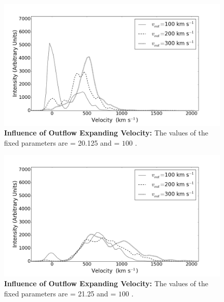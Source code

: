\begin{figure}[h!]
	\begin{center}
		\includegraphics[width=1\textwidth]{./figures/appendix/inf_vout1_soft.png}
	\end{center}
	\caption{\textbf{Influence of Outflow Expanding Velocity:} The values of the fixed parameters are \lognh = 20.125 and \vrot = $100$ \kms.}
	\label{fig:influence_vout1}
\end{figure}

\begin{figure}[h!]
	\begin{center}
		\includegraphics[width=1\textwidth]{./figures/appendix/inf_vout2_soft.png}
	\end{center}
	\caption{\textbf{Influence of Outflow Expanding Velocity:} The values of the fixed parameters are \lognh = 21.25 and \vrot = $100$ \kms.}
	\label{fig:influence_vout2}
\end{figure}